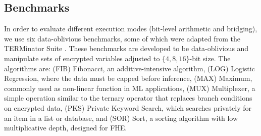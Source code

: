 \subsection{Benchmarks}\label{ss:benchmarks}

In order to evaluate different execution modes (bit-level arithmetic and bridging), we use six data-oblivious benchmarks, some of which were adapted from the TERMinator Suite \cite{terminator}. These benchmarks are developed to be data-oblivious and manipulate sets of encrypted variables adjusted to $\{4, 8, 16\}$-bit size.
The algorithms are: (FIB) Fibonacci, an additive-intensive algorithm, (LOG) Logistic Regression, where the data must be capped before inference, (MAX) Maximum, commonly used as non-linear function in ML applications, (MUX) Multiplexer, a simple operation similar to the ternary operator that replaces branch conditions on encrypted data, (PKS) Private Keyword Search, which searches privately for an item in a list or database, and (SOR) Sort, a sorting algorithm with low multiplicative depth, designed for FHE.


